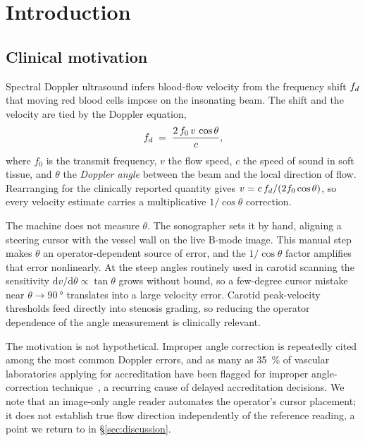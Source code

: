 \section{Introduction}
\label{sec:intro}

\subsection{Clinical motivation}
\label{sec:intro:clinical}

Spectral Doppler ultrasound infers blood-flow velocity from the frequency shift
$f_d$ that moving red blood cells impose on the insonating beam. The shift and
the velocity are tied by the Doppler equation,
%
\begin{equation}
  f_d \;=\; \frac{2\,f_0\,v\,\cos\theta}{c},
  \label{eq:doppler}
\end{equation}
%
where $f_0$ is the transmit frequency, $v$ the flow speed, $c$ the speed of
sound in soft tissue, and $\theta$ the \emph{Doppler angle} between the beam and
the local direction of flow. Rearranging for the clinically reported quantity
gives $v = c\,f_d / (2 f_0 \cos\theta)$, so every velocity estimate carries a
multiplicative $1/\cos\theta$ correction.

The machine does not measure $\theta$. The sonographer sets it by hand, aligning
a steering cursor with the vessel wall on the live B-mode image. This manual step
makes $\theta$ an operator-dependent source of error, and the $1/\cos\theta$
factor amplifies that error nonlinearly. At the steep angles routinely used in
carotid scanning the sensitivity $\mathrm{d}v/\mathrm{d}\theta \propto \tan\theta$
grows without bound, so a few-degree cursor mistake near
$\theta\!\to\!\SI{90}{\degree}$ translates into a large velocity error. Carotid
peak-velocity thresholds feed directly into stenosis grading, so reducing the
operator dependence of the angle measurement is clinically relevant.

The motivation is not hypothetical. Improper angle correction is repeatedly cited
among the most common Doppler errors, and as many as \SI{35}{\percent} of vascular
laboratories applying for accreditation have been flagged for improper
angle-correction technique~\citep{Saad2008}, a recurring cause of delayed
accreditation decisions. We note that an image-only angle reader automates the
operator's cursor placement; it does not establish true flow direction
independently of the reference reading, a point we return to in
\S\ref{sec:discussion}.


